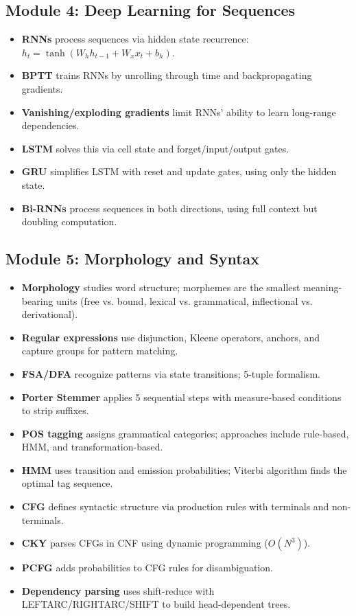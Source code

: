 \documentclass[11pt,a4paper]{article}
\begin{document}
\subsection{Module 4: Deep Learning for Sequences}
\begin{itemize}
    \item \textbf{RNNs} process sequences via hidden state recurrence: $h_t = \tanh(W_h h_{t-1} + W_x x_t + b_h)$.
    \item \textbf{BPTT} trains RNNs by unrolling through time and backpropagating gradients.
    \item \textbf{Vanishing/exploding gradients} limit RNNs' ability to learn long-range dependencies.
    \item \textbf{LSTM} solves this via cell state and forget/input/output gates.
    \item \textbf{GRU} simplifies LSTM with reset and update gates, using only the hidden state.
    \item \textbf{Bi-RNNs} process sequences in both directions, using full context but doubling computation.
\end{itemize}

\subsection{Module 5: Morphology and Syntax}
\begin{itemize}
    \item \textbf{Morphology} studies word structure; morphemes are the smallest meaning-bearing units (free vs. bound, lexical vs. grammatical, inflectional vs. derivational).
    \item \textbf{Regular expressions} use disjunction, Kleene operators, anchors, and capture groups for pattern matching.
    \item \textbf{FSA/DFA} recognize patterns via state transitions; 5-tuple formalism.
    \item \textbf{Porter Stemmer} applies 5 sequential steps with measure-based conditions to strip suffixes.
    \item \textbf{POS tagging} assigns grammatical categories; approaches include rule-based, HMM, and transformation-based.
    \item \textbf{HMM} uses transition and emission probabilities; Viterbi algorithm finds the optimal tag sequence.
    \item \textbf{CFG} defines syntactic structure via production rules with terminals and non-terminals.
    \item \textbf{CKY} parses CFGs in CNF using dynamic programming ($O(N^3)$).
    \item \textbf{PCFG} adds probabilities to CFG rules for disambiguation.
    \item \textbf{Dependency parsing} uses shift-reduce with LEFTARC/RIGHTARC/SHIFT to build head-dependent trees.
\end{itemize}
\end{document}

